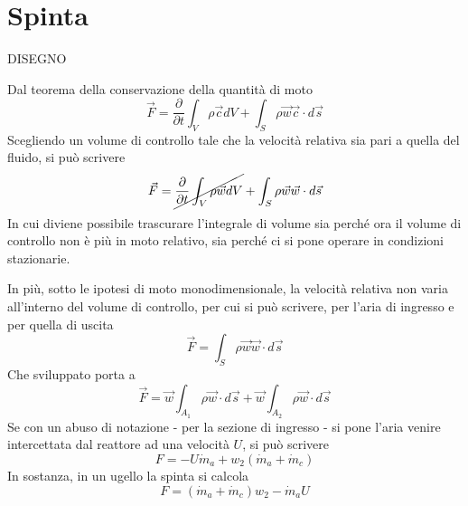\section{Spinta}
\begin{adjustwidth}{2in}{}
	
	DISEGNO
	
	Dal teorema della conservazione della quantità di moto
	\[\vec{F} = \dfrac{\partial}{\partial t}\int_V\rho\vec{c}dV + \int_S\rho\vec{w}\vec{c}\cdot d\vec{s}\]
	Scegliendo un volume di controllo tale che la velocità relativa sia pari a quella del fluido, si può scrivere 
	\[\vec{F} = \cancel{\dfrac{\partial}{\partial t}\int_V\rho\vec{w}dV} + \int_S\rho\vec{w}\vec{w}\cdot d\vec{s}\]	
	In cui diviene possibile trascurare l'integrale di volume sia perché ora il volume di controllo non è più in moto relativo, sia perché ci si pone operare in condizioni stazionarie. 
	
	In più, sotto le ipotesi di moto monodimensionale, la velocità relativa non varia all'interno del volume di controllo, per cui si può scrivere, per l'aria di ingresso e per quella di uscita
	\[\vec{F} = \int_S\rho\vec{w}\vec{w}\cdot d\vec{s}\] 
	Che sviluppato porta a 
	\[\vec{F} = \vec{w}\int_{A_1}\rho\vec{w}\cdot d\vec{s} + \vec{w}\int_{A_2}\rho\vec{w}\cdot d\vec{s}\]
	Se con un abuso di notazione - per la sezione di ingresso - si pone l'aria venire intercettata dal reattore ad una velocità $U$, si può scrivere
	\[F = -U\dot{m}_a + w_2(\dot{m}_a +\dot{m}_c)\]	
	In sostanza, in un ugello la spinta si calcola 
	\[F = (\dot{m}_a +\dot{m}_c)w_2 - \dot{m}_aU\]
\end{adjustwidth}


